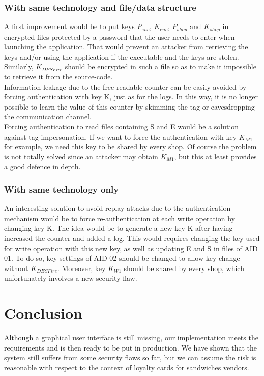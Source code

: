 \documentclass[a4paper,11pt,oneside]{article}
\begin{document}
\subsubsection{With same technology and file/data structure}

A first improvement would be to put keys $P_{enc}$, $K_{enc}$, $P_{shop}$ and $K_{shop}$ in encrypted files protected by a password that the user needs to enter when launching the application. That would prevent an attacker from retrieving the keys and/or using the application if the executable and the keys are stolen. Similarly, $K_{DESFire}$ should be encrypted in such a file so as to make it impossible to retrieve it from the source-code. \\

Information leakage due to the free-readable counter can be easily avoided by forcing authentication with key K, just as for the logs. In this way, it is no longer possible to learn the value of this counter by skimming the tag or eavesdropping the communication channel. \\

Forcing authentication to read files containing S and E would be a solution against tag impersonation. If we want to force the authentication with key $K_{M1}$ for example, we need this key to be shared by every shop. Of course the problem is not totally solved since an attacker may obtain $K_{M1}$, but this at least provides a good defence in depth. \\


\subsubsection{With same technology only}

An interesting solution to avoid replay-attacks due to the authentication mechanism would be to force re-authentication at each write operation by changing key K. The idea would be to generate a new key K after having increased the counter and added a log. This would requires changing the key used for write operation with this new key, as well as updating E and S in files of AID 01. To do so, key settings of AID 02 should be changed to allow key change without $K_{DESFire}$. Moreover, key $K_{W1}$ should be shared by every shop, which unfortunately involves a new security flaw. \\

\section{Conclusion}

Although a graphical user interface is still missing, our implementation meets the requirements and is then ready to be put in production. We have shown that the system  still suffers from some security flaws so far, but we can assume the risk is reasonable with respect to the context of loyalty cards for sandwiches vendors. \\
\end{document}
